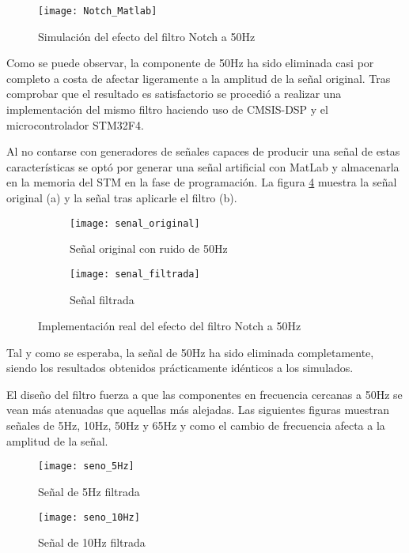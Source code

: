 \begin{figure} [h]
    \centering
    \texttt{[image: Notch\_Matlab]}
    \caption{Simulación del efecto del filtro Notch a 50Hz}
    \label{fig:Notch_Matlab}
\end{figure}

Como se puede observar, la componente de 50Hz ha sido eliminada casi por completo a costa de afectar ligeramente a la amplitud de la señal original. Tras comprobar que el resultado es satisfactorio se procedió a realizar una implementación del mismo filtro haciendo uso de CMSIS-DSP y el microcontrolador STM32F4.

Al no contarse con generadores de señales capaces de producir una señal de estas características se optó por generar una señal artificial con MatLab y almacenarla en la memoria del STM en la fase de programación. La figura \ref{fig:Filtro_en_STM} muestra la señal original (a) y la señal tras aplicarle el filtro (b).

\begin{figure}[H]
  \begin{subfigure}[b]{8cm}
   	\centering
    \texttt{[image: senal\_original]}
    \caption{Señal original con ruido de 50Hz}
    \label{fig:senal_original}
  \end{subfigure}
  \hfill
  \begin{subfigure}[b]{8cm}
  	\centering
    \texttt{[image: senal\_filtrada]}
    \caption{Señal filtrada}
    \label{fig:senal_original}
  \end{subfigure}
  \caption{Implementación real del efecto del filtro Notch a 50Hz}
  \label{fig:Filtro_en_STM}
\end{figure}

Tal y como se esperaba, la señal de 50Hz ha sido eliminada completamente, siendo los resultados obtenidos prácticamente idénticos a los simulados.

El diseño del filtro fuerza a que las componentes en frecuencia cercanas a 50Hz se vean más atenuadas que aquellas más alejadas. Las siguientes figuras muestran señales de 5Hz, 10Hz, 50Hz y 65Hz y como el cambio de frecuencia afecta a la amplitud de la señal.

\begin{figure} [H]
    \centering
    \texttt{[image: seno\_5Hz]}
    \caption{Señal de 5Hz filtrada}
    \label{fig:seno_5Hz}
\end{figure}

\begin{figure} [H]
    \centering
    \texttt{[image: seno\_10Hz]}
    \caption{Señal de 10Hz filtrada}
    \label{fig:seno_10Hz}
\end{figure}

